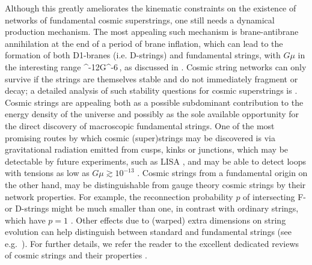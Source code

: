 Although this greatly ameliorates the kinematic constraints on the existence of networks of fundamental cosmic superstrings, one still needs a dynamical production mechanism. 
%
The most appealing such mechanism is brane-antibrane annihilation at the end of a period of brane inflation, which can lead to the formation of both D1-branes (i.e. D-strings) and fundamental strings, with $G\mu$ in the interesting range 
^{-12}\lesssim G\mu {}^{-6}\,,
\ee
as discussed in \cite{Sarangi:2002yt, Jones:2003da}.
Cosmic string networks can only survive if the strings are themselves stable and do not immediately fragment or decay; a detailed analysis of such stability questions for cosmic superstrings is \cite{Copeland:2003bj}.
%
Cosmic strings are appealing both as a possible subdominant contribution to the energy density of the universe and 
possibly as  the sole available opportunity for the direct discovery of  macroscopic fundamental strings. 
One of the most promising routes by which cosmic (super)strings may be discovered is via gravitational radiation emitted from cusps, kinks or junctions, which may be detectable by future experiments, such as LISA \cite{amaroseoane2017laser}, and may be able to  detect loops with tensions as low as $G\mu \gtrsim 10^{-13}$ \cite{Damour:2000wa,Damour:2001bk,Damour:2004kw,Siemens:2006vk,Polchinski:2007qc}.  
Cosmic strings from a fundamental origin on the other hand, may be distinguishable from gauge theory cosmic strings by their network properties. 
For example, the reconnection probability $p$ of intersecting F- or D-strings might be much smaller than one, in contrast with ordinary strings, which have $p=1$ \cite{Jackson:2004zg}. Other effects due to (warped) extra dimensions on string evolution can help distinguish between standard and fundamental strings (see e.g.~\cite{Avgoustidis:2004zt,Blanco-Pillado:2005uwc,Avgoustidis:2007ju,OCallaghan:2010mtk,OCallaghan:2010jrm,Avgoustidis:2012vc}).
%
For further details, we refer the reader to the excellent dedicated reviews of cosmic strings and their properties \cite{Hindmarsh:1994re, Polchinski:2004ia, Copeland:2009ga}.

\enddocument

\newpage


